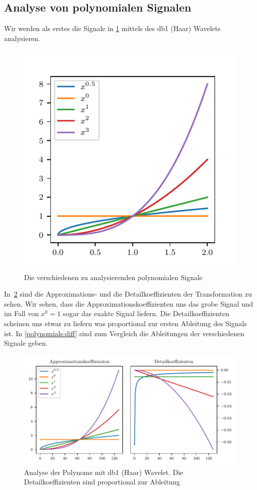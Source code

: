 \begin{refsection}
\section{Analyse von polynomialen Signalen}

Wir werden als erstes die Signale in \cref{polynomials:signals} mittels des db1
(Haar) Wavelets analysieren.
\begin{figure}
    \centering
    \includegraphics{papers/polynomials/images/polynomials_signals.pdf}
    \caption{Die verschiedenen zu analysierenden polynomialen Signale\label{polynomials:signals}}
\end{figure}
In~\cref{polynomials:haar} sind die Approximations- und die Detailkoeffizienten
der Transformation zu sehen. Wir sehen, dass die Approximationskoeffizienten
uns das grobe Signal und im Fall von $x^0 = 1$ sogar das exakte Signal liefern.
Die Detailkoeffizienten scheinen uns etwas zu liefern was proportional zur
ersten Ableitung des Signals ist. In \cref{polynomials:diff} sind zum Vergleich
die Ableitungen der verschiedenen Signale geben.

\begin{figure}
    \centering
    \includegraphics{papers/polynomials/images/polynomials_signals_db1.pdf}
    \caption{Analyse der Polynome mit db1 (Haar) Wavelet. Die
             Detailkoeffizienten sind proportional zur
             Ableitung\label{polynomials:haar}}
\end{figure}


\end{refsection}
